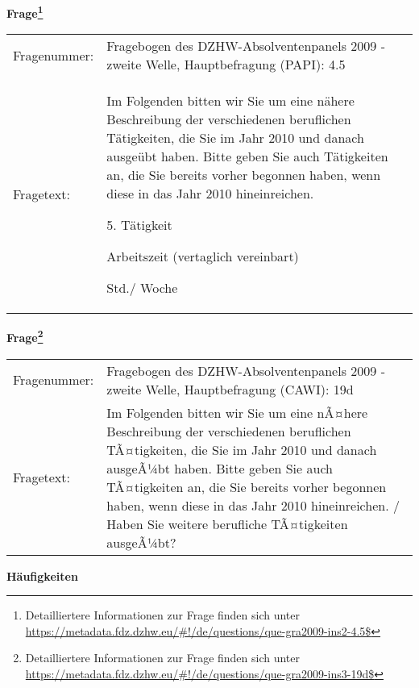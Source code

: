 				\vspace*{0.5cm}
                \noindent\textbf{Frage\footnote{Detailliertere Informationen zur Frage finden sich unter
		              \url{https://metadata.fdz.dzhw.eu/\#!/de/questions/que-gra2009-ins2-4.5$}}}\\
				\begin{tabularx}{\hsize}{@{}lX}
					Fragenummer: &
					  Fragebogen des DZHW-Absolventenpanels 2009 - zweite Welle, Hauptbefragung (PAPI):
					  4.5
 \\
					Fragetext: & Im Folgenden bitten wir Sie um eine nähere Beschreibung der verschiedenen beruflichen Tätigkeiten, die Sie im Jahr 2010 und danach ausgeübt haben. Bitte geben Sie auch Tätigkeiten an, die Sie bereits vorher begonnen haben, wenn diese in das Jahr 2010 hineinreichen.\par  5. Tätigkeit\par  Arbeitszeit (vertaglich vereinbart)\par  Std./ Woche \\
				\end{tabularx}
				\vspace*{0.5cm}
                \noindent\textbf{Frage\footnote{Detailliertere Informationen zur Frage finden sich unter
		              \url{https://metadata.fdz.dzhw.eu/\#!/de/questions/que-gra2009-ins3-19d$}}}\\
				\begin{tabularx}{\hsize}{@{}lX}
					Fragenummer: &
					  Fragebogen des DZHW-Absolventenpanels 2009 - zweite Welle, Hauptbefragung (CAWI):
					  19d
 \\
					Fragetext: & Im Folgenden bitten wir Sie um eine nÃ¤here Beschreibung der verschiedenen beruflichen TÃ¤tigkeiten, die Sie im Jahr 2010 und danach ausgeÃ¼bt haben. Bitte geben Sie auch TÃ¤tigkeiten an, die Sie bereits vorher begonnen haben, wenn diese in das Jahr 2010 hineinreichen. / Haben Sie weitere berufliche TÃ¤tigkeiten ausgeÃ¼bt? \\
				\end{tabularx}





        		\vspace*{0.5cm}
                \noindent\textbf{Häufigkeiten}

